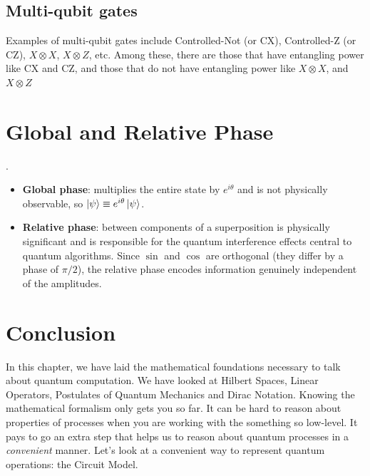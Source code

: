 \documentclass[12pt, a4paper, oneside]{report}
\theoremstyle{plain}
\theoremstyle{definition}
\theoremstyle{remark}
\begin{document}
\subsection{Multi-qubit gates}
Examples of multi-qubit gates include Controlled-Not (or CX), Controlled-Z (or CZ), $X \otimes X$, $X \otimes Z$, etc. Among these, there are those that have entangling power like CX and CZ, and those that do not have entangling power like $X \otimes X$, and $X \otimes Z$
\section{Global and Relative Phase}.

\begin{itemize}
  \item \textbf{Global phase}: multiplies the entire state by $e^{i\theta}$ and is not
        physically observable, so $\ket{\psi} \equiv e^{i\theta}\ket{\psi}$.
  \item \textbf{Relative phase}: between components of a superposition is physically
        significant and is responsible for the quantum interference effects central to quantum algorithms.
        Since $\sin$ and $\cos$ are orthogonal (they differ by a phase of $\pi/2$), the
        relative phase encodes information genuinely independent of the amplitudes.
\end{itemize}



\section{Conclusion}
In this chapter, we have laid the mathematical foundations necessary to talk about quantum computation. We have looked at Hilbert Spaces, Linear Operators, Postulates of Quantum Mechanics and Dirac Notation. Knowing the mathematical formalism only gets you so far. It can be hard to reason about properties of processes when you are working with the something so low-level. It pays to go an extra step that helps us to reason about quantum processes in a \emph{convenient} manner. Let's look at a convenient way to represent quantum operations: the Circuit Model.


\end{document}
